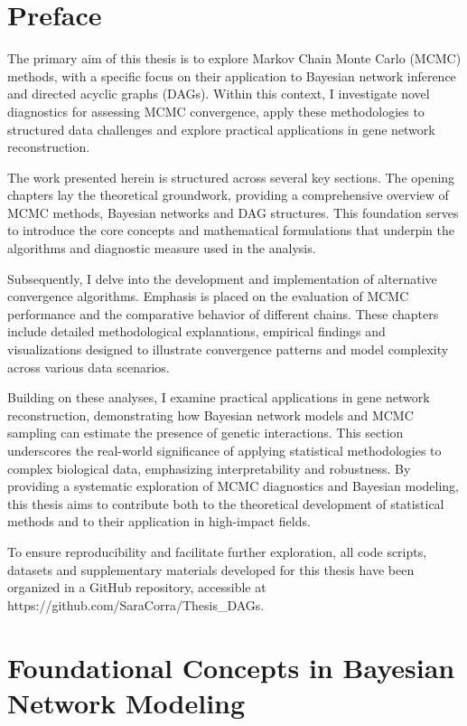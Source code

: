 \documentclass{report}
\begin{document}
\tableofcontents
\pagestyle{plain}

\chapter{Preface}

The primary aim of this thesis is to explore Markov Chain Monte Carlo (MCMC) methods, with a specific focus on their application to Bayesian network inference and directed acyclic graphs (DAGs). Within this context, I investigate novel diagnostics for assessing MCMC convergence, apply these methodologies to structured data challenges and explore practical applications in gene network reconstruction.

The work presented herein is structured across several key sections. The opening chapters lay the theoretical groundwork, providing a comprehensive overview of MCMC methods, Bayesian networks and DAG structures. This foundation serves to introduce the core concepts and mathematical formulations that underpin the algorithms and diagnostic measure used in the analysis.

Subsequently, I delve into the development and implementation of alternative convergence algorithms. Emphasis is placed on the evaluation of MCMC performance and the comparative behavior of different chains. These chapters include detailed methodological explanations, empirical findings and visualizations designed to illustrate convergence patterns and model complexity across various data scenarios.

Building on these analyses, I examine practical applications in gene network reconstruction, demonstrating how Bayesian network models and MCMC sampling can estimate the presence of genetic interactions. This section underscores the real-world significance of applying statistical methodologies to complex biological data, emphasizing interpretability and robustness.
By providing a systematic exploration of MCMC diagnostics and Bayesian modeling, this thesis aims to contribute both to the theoretical development of statistical methods and to their application in high-impact fields.

To ensure reproducibility and facilitate further exploration, all code scripts, datasets and supplementary materials developed for this thesis have been organized in a GitHub repository, accessible at https://github.com/SaraCorra/Thesis\_DAGs.

\chapter{Foundational Concepts in Bayesian Network Modeling}
\end{document}
